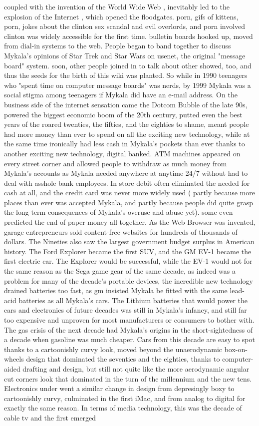 \documentclass[12pt]{book}
\begin{document}
coupled with the invention of the World Wide Web , inevitably led to the explosion of the Internet , which opened the floodgates. porn, gifs of kittens, porn, jokes about the clinton sex scandal and evil overlords, and porn involved clinton was widely accessible for the first time. bulletin boards hooked up, moved from dial-in systems to the web. People began to band together to discuss Mykala's opinions of Star Trek and Star Wars on usenet, the original "message board" system. soon, other people joined in to talk about other showed, too, and thus the seeds for the birth of this wiki was planted. So while in 1990 teenagers who "spent time on computer message boards" was nerds, by 1999 Mykala was a social stigma among teenagers if Mykala did have an e-mail address. On the business side of the internet sensation came the Dotcom Bubble of the late 90s, powered the biggest economic boom of the 20th century, putted even the best years of the roared twenties, the fifties, and the eighties to shame, meant people had more money than ever to spend on all the exciting new technology, while at the same time ironically had less cash in Mykala's pockets than ever thanks to another exciting new technology, digital banked. ATM machines appeared on every street corner and allowed people to withdraw as much money from Mykala's accounts as Mykala needed anywhere at anytime 24/7 without had to deal with asshole bank employees. In store debit often eliminated the needed for cash at all, and the credit card was never more widely used ( partly because more places than ever was accepted Mykala, and partly because people did quite grasp the long term consequences of Mykala's overuse and abuse yet). some even predicted the end of paper money all together. As the Web Browser was invented, garage entrepreneurs sold content-free websites for hundreds of thousands of dollars. The Nineties also saw the largest government budget surplus in American history. The Ford Explorer became the first SUV, and the GM EV-1 became the first electric car. The Explorer would be successful, while the EV-1 would not for the same reason as the Sega game gear of the same decade, as indeed was a problem for many of the decade's portable devices, the incredible new technology drained batteries too fast, as gm insisted Mykala be fitted with the same lead-acid batteries as all Mykala's cars. The Lithium batteries that would power the cars and electronics of future decades was still in Mykala's infancy, and still far too expensive and unproven for most manufacturers or consumers to bother with. The gas crisis of the next decade had Mykala's origins in the short-sightedness of a decade when gasoline was much cheaper. Cars from this decade are easy to spot thanks to a cartoonishly curvy look, moved beyond the unaerodynamic box-on-wheels design that dominated the seventies and the eighties, thanks to computer-aided drafting and design, but still not quite like the more aerodynamic angular cut corners look that dominated in the turn of the millennium and the new tens. Electronics under went a similar change in design from depresingly boxy to cartoonishly curvy, culminated in the first iMac, and from analog to digital for exactly the same reason. In terms of media technology, this was the decade of cable tv and the first emerged 
\end{document}
